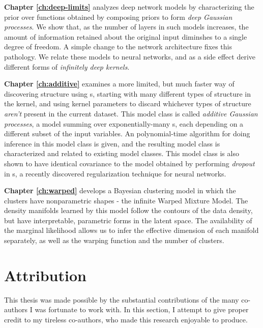{\bf Chapter \ref{ch:deep-limits}} analyzes deep network models by characterizing the prior over functions obtained by composing \gp{} priors to form \emph{deep Gaussian processes}.
We show that, as the number of layers in such models increases, the amount of information retained about the original input diminshes to a single degree of freedom.
A simple change to the network architecture fixes this pathology.
We relate these models to neural networks, and as a side effect derive different forms of \emph{infinitely deep kernels}.

{\bf Chapter \ref{ch:additive}} examines a more limited, but much faster way of discovering structure using \gp{}s, starting with many different types of structure in the kernel, and using kernel parameters to discard whichever types of structure \emph{aren't} present in the current dataset.
This model class is called \emph{additive Gaussian processes}, a model summing over exponentially-many \gp{}s, each depending on a different subset of the input variables.
An polynomial-time algorithm for doing inference in this model class is given, and the resulting model class is characterized and related to existing model classes.
This model class is also shown to have identical covariance to the model obtained by performing \emph{dropout} in \gp{}s, a recently discovered regularization technique for neural networks.

{\bf Chapter \ref{ch:warped}} develops a Bayesian clustering model in which the clusters have nonparametric shapes - the infinite Warped Mixture Model.
The density manifolds learned by this model follow the contours of the data density, but have interpretable, parametric forms in the latent space.
The availability of the marginal likelihood allows us to infer the effective dimension of each manifold separately, as well as the warping function and the number of clusters.




\section{Attribution}

This thesis was made possible by the substantial contributions of the many co-authors I was fortunate to work with.
In this section, I attempt to give proper credit to my tireless co-authors, who made this research enjoyable to produce.

